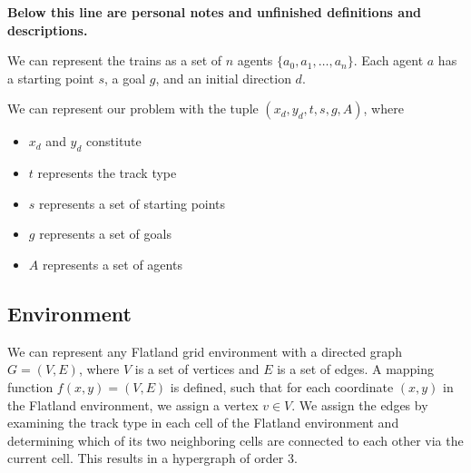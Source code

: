 \documentclass{article}
\begin{document}
\hline \medskip

\textbf{Below this line are personal notes and unfinished definitions and descriptions.} \medskip

We can represent the trains as a set of $n$ agents $\{a_{0}, a_{1}, …, a_{n}\}$.  Each agent $a$ has a starting point $s$, a goal $g$, and an initial direction $d$.  \medskip

We can represent our problem with the tuple $(x_{d}, y_{d}, t, s, g, A)$, where
\begin{itemize}
    \item $x_{d}$ and $y_{d}$ constitute
    \item $t$ represents the track type
    \item $s$ represents a set of starting points
    \item $g$ represents a set of goals
    \item $A$ represents a set of agents
\end{itemize}

\subsection{Environment}
We can represent any Flatland grid environment with a directed graph $G = (V,E)$, where $V$ is a set of vertices and $E$ is a set of edges.  A mapping function $f(x,y) = (V,E)$ is defined, such that for each coordinate $(x,y)$ in the Flatland environment, we assign a vertex $v \in V$.  We assign the edges by examining the track type in each cell of the Flatland environment and determining which of its two neighboring cells are connected to each other via the current cell.  This results in a hypergraph of order $3$.
\end{document}
